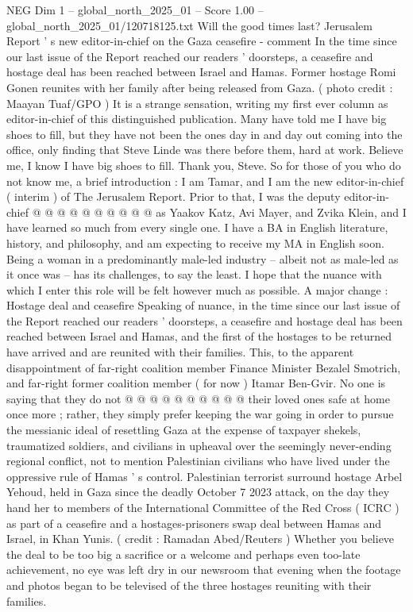 \begin{textsample}{NEG Dim 1 – global\_north\_2025\_01 – Score 1.00 – global\_north\_2025\_01/120718125.txt}  \label{ex:f1_neg_063}
Will the good times last?
Jerusalem Report ' s new editor-in-chief on the Gaza ceasefire - comment In the time since our last issue of the Report reached our readers ' doorsteps, a ceasefire and hostage deal has been reached between Israel and Hamas.
Former hostage Romi Gonen reunites with her family after being released from Gaza. ( photo credit : Maayan Tuaf/GPO ) It is a strange sensation, writing my first ever column as editor-in-chief of this distinguished publication.
Many have told me I have big shoes to fill, but they have not been the ones day in and day out coming into the office, only finding that Steve Linde was there before them, hard at work.
Believe me, I know I have big shoes to fill.
Thank you, Steve.
So for those of you who do not know me, a brief introduction : I am Tamar, and I am the new editor-in-chief ( interim ) of The Jerusalem Report.
Prior to that, I was the deputy editor-in-chief @ @ @ @ @ @ @ @ @ @ as Yaakov Katz, Avi Mayer, and Zvika Klein, and I have learned so much from every single one.
I have a BA in English literature, history, and philosophy, and am expecting to receive my MA in English soon.
Being a woman in a predominantly male-led industry -- albeit not as male-led as it once was -- has its challenges, to say the least.
I hope that the nuance with which I enter this role will be felt however much as possible.
A major change : Hostage deal and ceasefire Speaking of nuance, in the time since our last issue of the Report reached our readers ' doorsteps, a ceasefire and hostage deal has been reached between Israel and Hamas, and the first of the hostages to be returned have arrived and are reunited with their families.
This, to the apparent disappointment of far-right coalition member Finance Minister Bezalel Smotrich, and far-right former coalition member ( for now ) Itamar Ben-Gvir.
No one is saying that they do not @ @ @ @ @ @ @ @ @ @ their loved ones safe at home once more ; rather, they simply prefer keeping the war going in order to pursue the messianic ideal of resettling Gaza at the expense of taxpayer shekels, traumatized soldiers, and civilians in upheaval over the seemingly never-ending regional conflict, not to mention Palestinian civilians who have lived under the oppressive rule of Hamas ' s control.
Palestinian terrorist surround hostage Arbel Yehoud, held in Gaza since the deadly October 7 2023 attack, on the day they hand her to members of the International Committee of the Red Cross ( ICRC ) as part of a ceasefire and a hostages-prisoners swap deal between Hamas and Israel, in Khan Yunis. ( credit : Ramadan Abed/Reuters ) Whether you believe the deal to be too big a sacrifice or a welcome and perhaps even too-late achievement, no eye was left dry in our newsroom that evening when the footage and photos began to be televised of the three hostages reuniting with their families.

\end{textsample}
